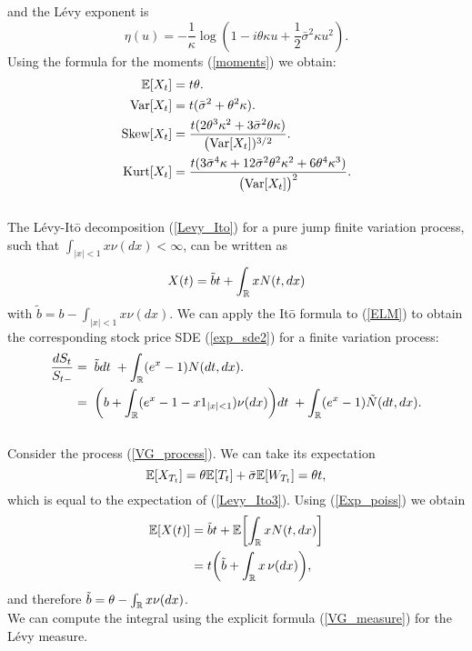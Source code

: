 and the Lévy exponent is 
\begin{equation}
 \eta(u) = -\frac{1}{\kappa} \log(1-i\theta \kappa u + \frac{1}{2} \bar\sigma^2 \kappa u^2).
\end{equation}
Using the formula for the moments (\ref{moments}) we obtain:
\begin{align}\label{VG_cumulants}
 \mathbb{E}[X_t] &= t\theta. \\ \nonumber
 \mbox{Var}[X_t] &= t(\bar\sigma^2 + \theta^2 \kappa). \\ \nonumber
 \mbox{Skew}[X_t] &= \frac{t (2\theta^3\kappa^2 + 3 \bar\sigma^2 \theta \kappa)}{\bigl(\mbox{Var}[X_t])^{3/2}}. \\ \nonumber
 \mbox{Kurt}[X_t] &= \frac{t (3\bar\sigma^4 \kappa + 12\bar\sigma^2 \theta^2 \kappa^2 +6\theta^4\kappa^3)}{\bigl(\mbox{Var}[X_t]\bigr)^2}.\nonumber 
\end{align}
\\
The Lévy-It\={o} decomposition (\ref{Levy_Ito}) for a pure jump finite variation process, such that $\int_{|x|<1} x \nu(dx) < \infty$, 
can be written as
\begin{equation}\label{Levy_Ito3}
X(t) = \tilde b t + \int_{\mathbb{R}} x N(t,dx) 
\end{equation}
with $\tilde b = b - \int_{|x|<1} x \nu(dx)$. We can apply the It\={o} formula to (\ref{ELM}) to obtain the corresponding
stock price SDE (\ref{exp_sde2}) for a finite variation process: 
\begin{align}
 \frac{d S_t}{S_{t-}}  &= \; \tilde b dt \; + \int_{\mathbb{R}} (e^{x} - 1) N(dt,dx).  \\ \nonumber
                       &= \; \biggl( b + \int_{\mathbb{R}} (e^{x} -1 -x1_{|x|<1}) \nu(dx) \biggr) dt \; + \int_{\mathbb{R}} (e^{x} - 1) \tilde N(dt,dx).  
\end{align}
\\
Consider the process (\ref{VG_process}). We can take its expectation 
$$\mathbb{E}[X_{T_t}] = \theta \mathbb{E}[T_t] + \bar\sigma \mathbb{E}[W_{T_t}] = \theta t,$$ 
which is equal to the expectation of (\ref{Levy_Ito3}). Using (\ref{Exp_poiss}) we obtain
\begin{align}
 \mathbb{E}[X(t)] &= \tilde b t + \mathbb{E} \biggl[ \int_{\mathbb{R}} x N(t,dx)\biggr] \\ \nonumber
	  &= t \biggl( \tilde b + \int_{\mathbb{R}} x \, \nu(dx) \biggr), \nonumber
\end{align}
and therefore $ \tilde b = \theta - \int_{\mathbb{R}} x \nu(dx) $.\\
We can compute the integral using the explicit formula (\ref{VG_measure}) for the Lévy measure.
